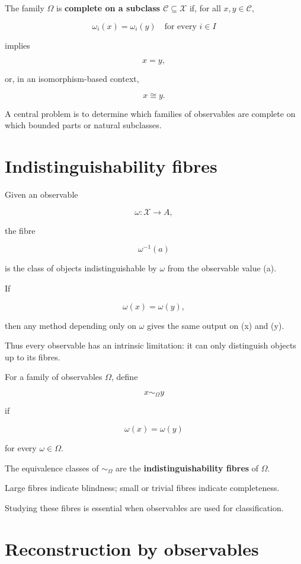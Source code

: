 \documentclass[11pt]{article}
\begin{document}
The family \(\Omega\) is \textbf{complete on a subclass \(\mathcal C\subseteq\mathcal X\)} if, for all \(x,y\in\mathcal C\),

\[
\omega_i(x)=\omega_i(y)\quad\text{for every }i\in I
\]

implies

\[
x=y,
\]

or, in an isomorphism-based context,

\[
x\cong y.
\]

A central problem is to determine which families of observables are complete on which bounded parts or natural subclasses.


\section{Indistinguishability fibres}

Given an observable

\[
\omega:\mathcal X\to A,
\]

the fibre

\[
\omega^{-1}(a)
\]

is the class of objects indistinguishable by \(\omega\) from the observable value (a).

If

\[
\omega(x)=\omega(y),
\]

then any method depending only on \(\omega\) gives the same output on (x) and (y).

Thus every observable has an intrinsic limitation: it can only distinguish objects up to its fibres.

For a family of observables \(\Omega\), define

\[
x\sim_\Omega y
\]

if

\[
\omega(x)=\omega(y)
\]

for every \(\omega\in\Omega\).

The equivalence classes of \(\sim_\Omega\) are the \textbf{indistinguishability fibres} of \(\Omega\).

Large fibres indicate blindness; small or trivial fibres indicate completeness.

Studying these fibres is essential when observables are used for classification.


\section{Reconstruction by observables}
\end{document}
